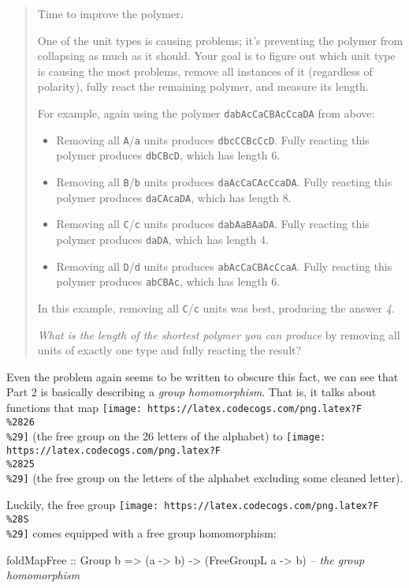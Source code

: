 \documentclass[]{article}
\newenvironment{Shaded}{}{}
\newcommand{\CommentTok}[1]{\textcolor[rgb]{0.38,0.63,0.69}{\textit{#1}}}
\newcommand{\DataTypeTok}[1]{\textcolor[rgb]{0.56,0.13,0.00}{#1}}
\newcommand{\NormalTok}[1]{#1}
\newcommand{\OtherTok}[1]{\textcolor[rgb]{0.00,0.44,0.13}{#1}}
\begin{document}
\begin{quote}
Time to improve the polymer.

One of the unit types is causing problems; it's preventing the polymer from
collapsing as much as it should. Your goal is to figure out which unit type is
causing the most problems, remove all instances of it (regardless of polarity),
fully react the remaining polymer, and measure its length.

For example, again using the polymer \texttt{dabAcCaCBAcCcaDA} from above:

\begin{itemize}
\tightlist
\item
  Removing all \texttt{A}/\texttt{a} units produces \texttt{dbcCCBcCcD}. Fully
  reacting this polymer produces \texttt{dbCBcD}, which has length 6.
\item
  Removing all \texttt{B}/\texttt{b} units produces \texttt{daAcCaCAcCcaDA}.
  Fully reacting this polymer produces \texttt{daCAcaDA}, which has length 8.
\item
  Removing all \texttt{C}/\texttt{c} units produces \texttt{dabAaBAaDA}. Fully
  reacting this polymer produces \texttt{daDA}, which has length 4.
\item
  Removing all \texttt{D}/\texttt{d} units produces \texttt{abAcCaCBAcCcaA}.
  Fully reacting this polymer produces \texttt{abCBAc}, which has length 6.
\end{itemize}

In this example, removing all \texttt{C}/\texttt{c} units was best, producing
the answer \emph{4}.

\emph{What is the length of the shortest polymer you can produce} by removing
all units of exactly one type and fully reacting the result?
\end{quote}

Even the problem again seems to be written to obscure this fact, we can see that
Part 2 is basically describing a \emph{group homomorphism}. That is, it talks
about functions that map
\texttt{[image: https://latex.codecogs.com/png.latex?F\\\%2826\\\%29]} (the free
group on the 26 letters of the alphabet) to
\texttt{[image: https://latex.codecogs.com/png.latex?F\\\%2825\\\%29]} (the free
group on the letters of the alphabet excluding some cleaned letter).

Luckily, the free group
\texttt{[image: https://latex.codecogs.com/png.latex?F\\\%28S\\\%29]} comes equipped
with a free group homomorphism:

\begin{Shaded}
\begin{Highlighting}[]
\NormalTok{foldMapFree}
\OtherTok{    ::} \DataTypeTok{Group}\NormalTok{ b}
    \OtherTok{=>}\NormalTok{ (a }\OtherTok{->}\NormalTok{ b)}
    \OtherTok{->}\NormalTok{ (}\DataTypeTok{FreeGroupL}\NormalTok{ a }\OtherTok{->}\NormalTok{ b)     }\CommentTok{-- the group homomorphism}
\end{Highlighting}
\end{Shaded}
\end{document}
